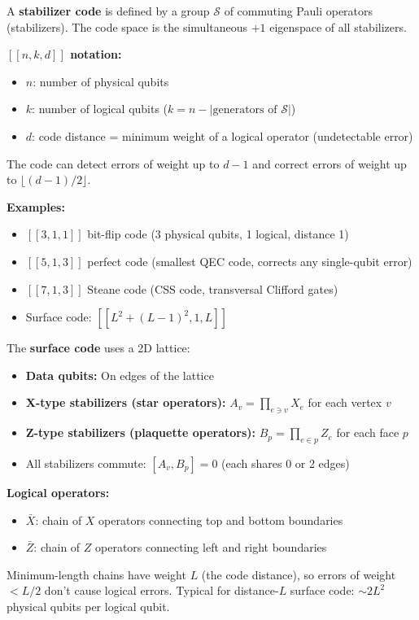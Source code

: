 \documentclass[11pt,a4paper]{article}
\begin{document}
\begin{answerbox}
A \textbf{stabilizer code} is defined by a group $\mathcal{S}$ of commuting Pauli operators (stabilizers). The code space is the simultaneous $+1$ eigenspace of all stabilizers.

\textbf{$[[n,k,d]]$ notation:}
\begin{itemize}
    \item $n$: number of physical qubits
    \item $k$: number of logical qubits ($k = n - |\text{generators of }\mathcal{S}|$)
    \item $d$: code distance = minimum weight of a logical operator (undetectable error)
\end{itemize}
The code can detect errors of weight up to $d-1$ and correct errors of weight up to $\lfloor(d-1)/2\rfloor$.

\textbf{Examples:}
\begin{itemize}
    \item $[[3,1,1]]$ bit-flip code (3 physical qubits, 1 logical, distance 1)
    \item $[[5,1,3]]$ perfect code (smallest QEC code, corrects any single-qubit error)
    \item $[[7,1,3]]$ Steane code (CSS code, transversal Clifford gates)
    \item Surface code: $[[L^2+(L-1)^2, 1, L]]$
\end{itemize}
\end{answerbox}

\begin{answerbox}
The \textbf{surface code} uses a 2D lattice:
\begin{itemize}
    \item \textbf{Data qubits:} On edges of the lattice
    \item \textbf{X-type stabilizers (star operators):} $A_v = \prod_{e \ni v} X_e$ for each vertex $v$
    \item \textbf{Z-type stabilizers (plaquette operators):} $B_p = \prod_{e \in p} Z_e$ for each face $p$
    \item All stabilizers commute: $[A_v, B_p] = 0$ (each shares 0 or 2 edges)
\end{itemize}
\textbf{Logical operators:}
\begin{itemize}
    \item $\bar{X}$: chain of $X$ operators connecting top and bottom boundaries
    \item $\bar{Z}$: chain of $Z$ operators connecting left and right boundaries
\end{itemize}
Minimum-length chains have weight $L$ (the code distance), so errors of weight $<L/2$ don't cause logical errors. Typical for distance-$L$ surface code: $\sim 2L^2$ physical qubits per logical qubit.
\end{answerbox}
\end{document}
